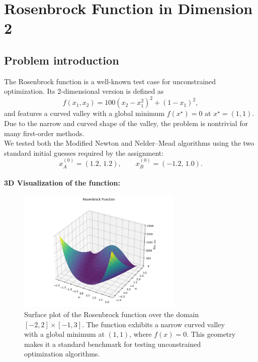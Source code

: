 \documentclass[a4paper,12pt]{article}
\begin{document}
	
	\vspace{1em}
	
	
	\vspace{1em}
	
	
	\newpage
	
	\section{Rosenbrock Function in Dimension 2}
	
	\subsection{Problem introduction}
	The Rosenbrock function is a well-known test case for unconstrained optimization. Its 2-dimensional version is defined as
	\[
	f(x_1,x_2) = 100(x_2 - x_1^2)^2 + (1 - x_1)^2,
	\]
	and features a curved valley with a global minimum \( f(x^\star) = 0 \) at \( x^\star = (1,1) \). Due to the narrow and curved shape of the valley, the problem is nontrivial for many first-order methods. \\
	
	We tested both the Modified Newton and Nelder–Mead algorithms using the two standard initial guesses required by the assignment:
	\[
	x^{(0)}_A = (1.2,\,1.2), \qquad x^{(0)}_B = (-1.2,\,1.0).
	\]\\
	
	\textbf{3D Visualization of the function:}
	\begin{figure}[htbp]
		\centering
		\includegraphics[width=0.7\textwidth]{../immagini/rosen3D_A.png}
		\caption{Surface plot of the Rosenbrock function over the domain $[-2, 2] \times [-1, 3]$. The function exhibits a narrow curved valley with a global minimum at $(1, 1)$, where $f(x) = 0$. This geometry makes it a standard benchmark for testing unconstrained optimization algorithms.}
		
		\label{fig:rosennewton}
	\end{figure}
	
\end{document}
